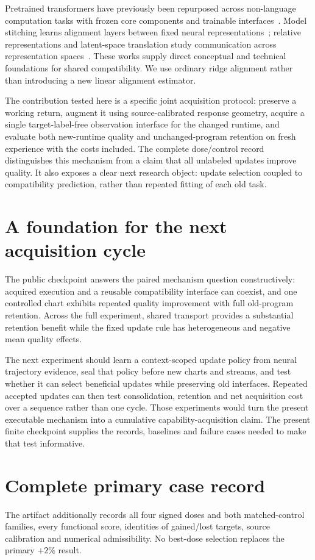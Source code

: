 \documentclass[11pt]{article}
\begin{document}
Pretrained transformers have previously been repurposed across non-language computation tasks with frozen core components and trainable interfaces~\cite{lu}. Model stitching learns alignment layers between fixed neural representations~\cite{stitch}; relative representations and latent-space translation study communication across representation spaces~\cite{relative,translation}. These works supply direct conceptual and technical foundations for shared compatibility. We use ordinary ridge alignment rather than introducing a new linear alignment estimator.

The contribution tested here is a specific joint acquisition protocol: preserve a working return, augment it using source-calibrated response geometry, acquire a single target-label-free observation interface for the changed runtime, and evaluate both new-runtime quality and unchanged-program retention on fresh experience with the costs included. The complete dose/control record distinguishes this mechanism from a claim that all unlabeled updates improve quality. It also exposes a clear next research object: update selection coupled to compatibility prediction, rather than repeated fitting of each old task.

\section{A foundation for the next acquisition cycle}
The public checkpoint answers the paired mechanism question constructively: acquired execution and a reusable compatibility interface can coexist, and one controlled chart exhibits repeated quality improvement with full old-program retention. Across the full experiment, shared transport provides a substantial retention benefit while the fixed update rule has heterogeneous and negative mean quality effects.

The next experiment should learn a context-scoped update policy from neural trajectory evidence, seal that policy before new charts and streams, and test whether it can select beneficial updates while preserving old interfaces. Repeated accepted updates can then test consolidation, retention and net acquisition cost over a sequence rather than one cycle. Those experiments would turn the present executable mechanism into a cumulative capability-acquisition claim. The present finite checkpoint supplies the records, baselines and failure cases needed to make that test informative.

\appendix
\section{Complete primary case record}
\begin{table}[ht]\centering\small

\caption{All twelve acquired $+2\%$ updates. $\Delta_k$ is the nonlinear temporal score change in block $k$. Direct and Shared are fresh-stream old-program retention.}
\end{table}
The artifact additionally records all four signed doses and both matched-control families, every functional score, identities of gained/lost targets, source calibration and numerical admissibility. No best-dose selection replaces the primary $+2\%$ result.
\end{document}
